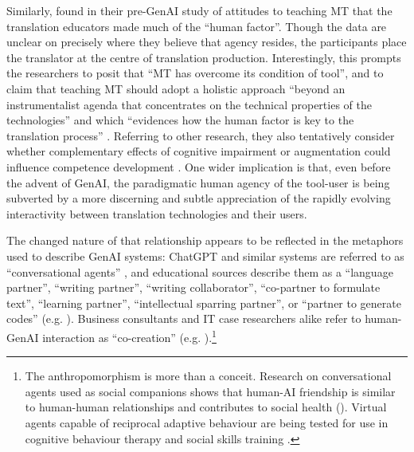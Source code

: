 \documentclass[output=paper]{langscibook}
\begin{document}
Similarly, \citet[188]{rico_role_2022} found in their pre-GenAI study of attitudes to teaching MT that the translation educators made much of the “human factor”. Though the data are unclear on precisely where they believe that agency resides, the participants place the translator at the centre of translation production. Interestingly, this prompts the researchers to posit that “MT has overcome its condition of tool”, and to claim that teaching MT should adopt a holistic approach “beyond an instrumentalist agenda that concentrates on the technical properties of the technologies” and which “evidences how the human factor is key to the translation process” \citep[190, 193]{rico_role_2022}. Referring to other research, they also tentatively consider whether complementary effects of cognitive impairment or augmentation could influence competence development \citep[192]{rico_role_2022}. One wider implication is that, even before the advent of GenAI, the paradigmatic human agency of the tool-user is being subverted by a more discerning and subtle appreciation of the rapidly evolving interactivity between translation technologies and their users. 

The changed nature of that relationship appears to be reflected in the metaphors used to describe GenAI systems: ChatGPT and similar systems are referred to as “conversational agents” \citep[75]{moorkens_artificial_2024}, and educational sources describe them as a “language partner”, “writing partner”, “writing collaborator”, “co-partner to formulate text”, “learning partner”, “intellectual sparring partner”, or “partner to generate codes” (e.g. \cites[ii: 64]{atlas_chatgpt_2023}[19--24]{gimpel_unlocking_2023}). Business consultants and IT case researchers alike refer to human\hyp GenAI interaction as “co-creation” (e.g. \cites[]{eapen_how_2023}[296]{nah_generative_2023}).\footnote{The anthropomorphism is more than a conceit. Research on conversational agents used as social companions shows that human-AI friendship is similar to human\hyp human relationships and contributes to social health (\citealt{brandtzaeg_my_2022, chaturvedi_social_2023, guingrich_chatbots_2023}). Virtual agents capable of reciprocal adaptive behaviour are being tested for use in cognitive behaviour therapy and social skills training \citep{woo_adaptive_2024}.}
\end{document}
